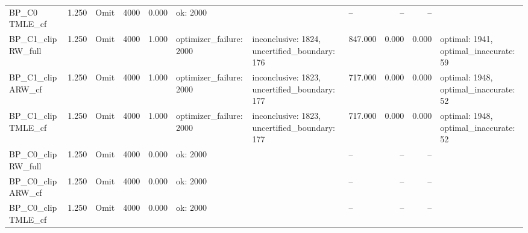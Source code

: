 \begin{tabular}{llllrlllrrl}
BP\_C0 TMLE\_cf & 1.250 & Omit & 4000 & 0.000 & ok: 2000 &  & -- & -- & -- &  \\
BP\_C1\_clip RW\_full & 1.250 & Omit & 4000 & 1.000 & optimizer\_failure: 2000 & inconclusive: 1824, uncertified\_boundary: 176 & 847.000 & 0.000 & 0.000 & optimal: 1941, optimal\_inaccurate: 59 \\
BP\_C1\_clip ARW\_cf & 1.250 & Omit & 4000 & 1.000 & optimizer\_failure: 2000 & inconclusive: 1823, uncertified\_boundary: 177 & 717.000 & 0.000 & 0.000 & optimal: 1948, optimal\_inaccurate: 52 \\
BP\_C1\_clip TMLE\_cf & 1.250 & Omit & 4000 & 1.000 & optimizer\_failure: 2000 & inconclusive: 1823, uncertified\_boundary: 177 & 717.000 & 0.000 & 0.000 & optimal: 1948, optimal\_inaccurate: 52 \\
BP\_C0\_clip RW\_full & 1.250 & Omit & 4000 & 0.000 & ok: 2000 &  & -- & -- & -- &  \\
BP\_C0\_clip ARW\_cf & 1.250 & Omit & 4000 & 0.000 & ok: 2000 &  & -- & -- & -- &  \\
BP\_C0\_clip TMLE\_cf & 1.250 & Omit & 4000 & 0.000 & ok: 2000 &  & -- & -- & -- &  \\
\hline
\end{tabular}
